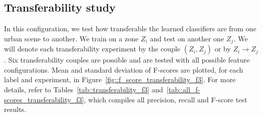     \subsection{Transferability study}
        \label{subsec::experiments::scalability::transferability}
        In this configuration, we test how transferable the learned classifiers are from one urban scene to another.
        We train on a zone $Z_i$ and test on another one $Z_j$.
        We will denote each transferability experiment by the couple $(Z_i, Z_j)$ or by $Z_i \rightarrow Z_j$.
        Six transferability couples are possible and are tested with all possible feature configurations.
        Mean and standard deviation of F-scores are plotted, for each label and experiment, in Figure~\ref{fig::f_score_transferability_f3}.
        For more details, refer to Tables~\ref{tab::transferability_f3} and~\ref{tab::all_f-scores_transferability_f3}, which compiles all precision, recall and F-score test results.\\
        
        \begin{figure}[htbp]
        \end{figure}

